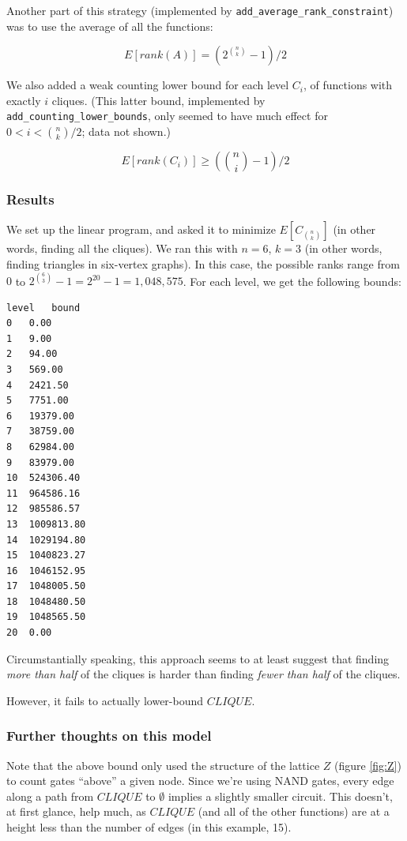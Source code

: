 \documentclass[12pt]{article}
\theoremstyle{definition}
\begin{document}
Another part of this strategy 
(implemented by {\tt add\_average\_rank\_constraint}) was
to use the average of all the functions:

\[
E[rank(A)] = (2^{n \choose k} - 1) / 2
\]

We also added a weak counting lower bound for each level $C_i$, of functions
with exactly $i$ cliques. (This latter bound, implemented by
{\tt add\_counting\_lower\_bounds}, only seemed to have much
effect for $0 < i < {n \choose k}/2$; data not shown.)

\[
E[rank(C_i)] \ge ({n \choose i} - 1) / 2
\]

\subsubsection{Results}

We set up the linear program, and asked it to minimize $E[C_{n \choose k}]$
(in other words, finding all the cliques). We ran this with $n=6$, $k=3$
(in other words, finding triangles in six-vertex graphs). In this case,
the possible ranks range from $0$ to $2^{6 \choose 3}-1 = 2^{20}-1 = 1,048,575$.
For each level, we get the following bounds:

\begin{verbatim}
level	bound
0	0.00
1	9.00
2	94.00
3	569.00
4	2421.50
5	7751.00
6	19379.00
7	38759.00
8	62984.00
9	83979.00
10	524306.40
11	964586.16
12	985586.57
13	1009813.80
14	1029194.80
15	1040823.27
16	1046152.95
17	1048005.50
18	1048480.50
19	1048565.50
20	0.00
\end{verbatim}

Circumstantially speaking, this approach seems to at least suggest
that finding {\em more than half} of the cliques is harder than finding
{\em fewer than half} of the cliques.

However, it fails to actually lower-bound $CLIQUE$.

\subsubsection{Further thoughts on this model}

Note that the above bound only used the structure of the lattice $Z$ 
(figure \ref{fig:Z}) to count gates ``above'' a given node.
Since we're using NAND gates, every edge along a path from $CLIQUE$ to $\emptyset$
implies a slightly smaller circuit. This doesn't, at first glance, help much, as
$CLIQUE$ (and all of the other functions) are at a height less than the number of edges
(in this example, 15).
\end{document}
